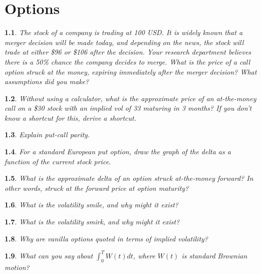 \documentclass{report}
\newtheorem{problem}{}
\numberwithin{problem}{chapter} %
\begin{document}
\chapter{Options}

\begin{problem}
The stock of a company is trading at 100 USD. It is widely known that a merger decision will be made today, and depending on the news, the stock will trade at either \$96 or \$106 after the decision. Your research department believes there is a 50\% chance
        the company decides to merge. What is the price of a call option struck at the money, expiring immediately after the merger decision? What assumptions did you make?
\end{problem}

\begin{problem}
Without using a calculator, what is the approximate price of an at-the-money call on a \$30 stock with an implied vol of 33 maturing in 3 months? If you don't know a shortcut for this, derive a shortcut.
\end{problem}

\begin{problem}
Explain put-call parity.
\end{problem}

\begin{problem}
\cite{CRACK} For a standard European put option, draw the graph of the delta as a function of the current stock price.
\end{problem}

\begin{problem}
What is the approximate delta of an option struck at-the-money forward? In other words, struck at the forward price at option maturity?
\end{problem}

\begin{problem}
What is the volatility smile, and why might it exist?
\end{problem}

\begin{problem}
What is the volatility smirk, and why might it exist?
\end{problem}

\begin{problem}
Why are vanilla options quoted in terms of implied volatility?
\end{problem}

\begin{problem}
\cite{CRACK} What can you say about $\int_0^{T} W(t)dt$, where $W(t)$ is standard Brownian motion?
\end{problem}
\end{document}
